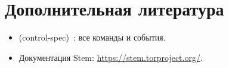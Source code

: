 \section*{Дополнительная литература}
\begin{itemize}
  \item {} (control-spec)~\cite{torspec}: все команды и события.
  \item Документация Stem: \url{https://stem.torproject.org/}.
\end{itemize}
